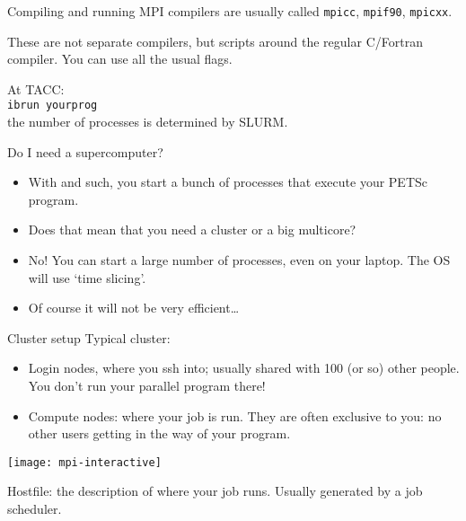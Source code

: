 
\begin{frame}[containsverbatim]{Compiling and running}
  MPI compilers are usually called \texttt{mpicc},
  \texttt{mpif90}, \texttt{mpicxx}.

  These are not separate compilers,
  but scripts around the regular C/Fortran compiler. You can use all
  the usual flags.

  At TACC:\\
  \verb+ibrun yourprog+\\
  the number of processes is determined by SLURM.
\end{frame}

\begin{frame}[containsverbatim]{Do I need a supercomputer?}
  \begin{itemize}
  \item With  and such, you start a bunch of processes that
    execute your PETSc program.
  \item Does that mean that you need a cluster or a big multicore?
  \item No! You can start a large number of processes, even on
    your laptop. The OS will use `time slicing'.
  \item Of course it will not be very efficient\ldots
  \end{itemize}
\end{frame}

\begin{frame}{Cluster setup}
  \small
  Typical cluster:
  \begin{itemize}
  \item Login nodes, where you ssh into; usually shared with 100 (or
    so) other people. You don't run your parallel program there!
  \item Compute nodes: where your job is run. They are often exclusive
    to you: no other users getting in the way of your program.
  \end{itemize}
  \texttt{[image: mpi-interactive]}

  Hostfile: the description of where your job runs. Usually generated
  by a job scheduler.
\end{frame}

